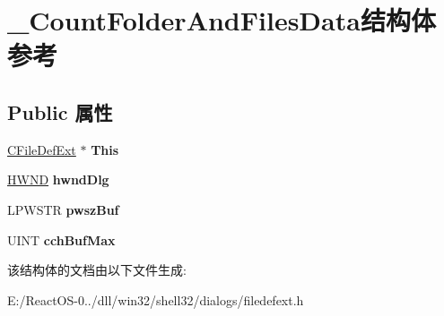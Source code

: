 \hypertarget{struct___count_folder_and_files_data}{}\section{\+\_\+\+Count\+Folder\+And\+Files\+Data结构体 参考}
\label{struct___count_folder_and_files_data}
\subsection*{Public 属性}
\begin{DoxyCompactItemize}
\item 
\mbox{\label{struct___count_folder_and_files_data_ab00a1fe1cdc0d095f2961f23ba16a7d0}} 
\hyperlink{class_c_file_def_ext}{C\+File\+Def\+Ext} $\ast$ {\bfseries This}
\item 
\mbox{\label{struct___count_folder_and_files_data_adf9e9a33bfdbbfe99eaff36f39af174c}} 
\hyperlink{interfacevoid}{H\+W\+ND} {\bfseries hwnd\+Dlg}
\item 
\mbox{\label{struct___count_folder_and_files_data_a2b9c7164458d7940f63b74accccbe7cd}} 
L\+P\+W\+S\+TR {\bfseries pwsz\+Buf}
\item 
\mbox{\label{struct___count_folder_and_files_data_ae295716bc73696555f4dc7d9e017e6d1}} 
U\+I\+NT {\bfseries cch\+Buf\+Max}
\end{DoxyCompactItemize}


该结构体的文档由以下文件生成\+:\begin{DoxyCompactItemize}
\item 
E\+:/\+React\+O\+S-\/0../dll/win32/shell32/dialogs/filedefext.\+h\end{DoxyCompactItemize}
